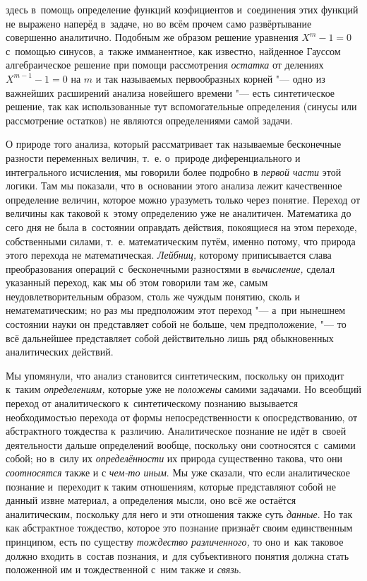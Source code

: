 здесь в~помощь определение функций коэфициентов и~соединения этих функций не
выражено наперёд в~задаче, но во всём прочем само развёртывание совершенно
аналитично. Подобным же образом решение уравнения $X^m-1=0$ с~помощью синусов,
а~также имманентное, как известно, найденное Гауссом алгебраическое
решение при помощи рассмотрения {\em остатка} от делениях $X^{m-1}-1=0$ на $m$
и так называемых первообразных корней "--- одно из важнейших расширений анализа
новейшего времени "--- есть синтетическое решение, так как использованные тут
вспомогательные определения (синусы или рассмотрение остатков) не являются
определениями самой задачи.

О природе того анализа, который рассматривает так называемые
бесконечные разности переменных величин, т.~е. о~природе диференциального и
интегрального исчисления, мы говорили более подробно в
{\em первой части} этой
логики. Там мы показали, что в~основании этого анализа лежит качественное
определение величин, которое можно уразуметь только через понятие. Переход
от величины как таковой к~этому определению уже не аналитичен. Математика
до сего дня не была в~состоянии оправдать действия, покоящиеся на этом
переходе, собственными силами, т.~е. математическим путём, именно потому,
что природа этого перехода не математическая.
{\em Лейбниц,} которому
приписывается слава преобразования операций с~бесконечными разностями в
{\em вычисление,} сделал
указанный переход, как мы об этом говорили там же, самым
неудовлетворительным образом, столь же чуждым понятию, сколь и
нематематическим; но раз мы предположим этот переход "--- а~при
нынешнем состоянии науки он представляет собой не больше, чем
предположение, "--- то всё дальнейшее представляет собой
действительно лишь ряд обыкновенных аналитических действий.

Мы упомянули, что анализ становится синтетическим, поскольку
он приходит к~таким {\em определениям,}
которые уже не
{\em положены} самими
задачами. Но всеобщий переход от аналитического к~синтетическому познанию
вызывается необходимостью перехода от формы непосредственности к
опосредствованию, от абстрактного тождества к~различию. Аналитическое
познание не идёт в~своей деятельности дальше определений вообще, поскольку
они соотносятся с~самими собой; но в~силу их
{\em определённости} их
природа существенно такова, что они
{\em соотносятся} также и
с {\em чем-то иным}.
Мы уже сказали, что если аналитическое познание и~переходит к
таким отношениям, которые представляют собой не данный извне материал, а
определения мысли, оно всё же остаётся аналитическим, поскольку для него и
эти отношения также суть {\em данные}.
Но так как абстрактное тождество, которое это познание
признаёт своим единственным принципом, есть по существу
{\em тождество различенного,}
то оно и~как таковое должно входить в~состав
познания, и~для субъективного понятия должна стать положенной им и
тождественной с~ним также и
{\em связь}.


